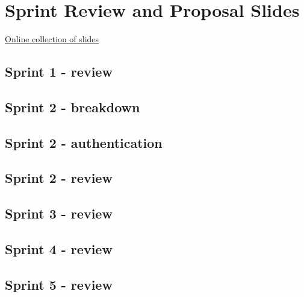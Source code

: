 
\chapter{Sprint Review and Proposal Slides}
\label{appendix:slides}

\href{https://goo.gl/BR75HN}{Online collection of slides}

\section{Sprint 1 - review}
\label{appendix:slides_1}


\section{Sprint 2 - breakdown}
\label{appendix:slides_2_breakdown}


\section{Sprint 2 - authentication}
\label{appendix:slides_2_authentication}


\section{Sprint 2 - review}
\label{appendix:slides_2}


\section{Sprint 3 - review}
\label{appendix:slides_3}


\section{Sprint 4 - review}
\label{appendix:slides_4}


\section{Sprint 5 - review}
\label{appendix:slides_5}

